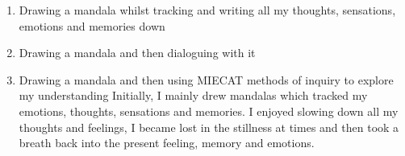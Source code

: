 \begin{enumerate}
\item Drawing a mandala whilst tracking and writing all my thoughts, sensations, emotions and memories down 
\item Drawing a mandala and then dialoguing with it 
\item Drawing a mandala and then using MIECAT methods of inquiry to explore my understanding 
Initially, I mainly drew mandalas which tracked my emotions, thoughts, sensations and memories. I enjoyed slowing down all my thoughts and feelings, I became lost in the stillness at times and then took a breath back into the present feeling, memory and emotions. 
\end{enumerate}














